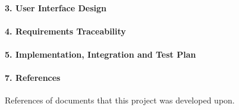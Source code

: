 \documentclass[../DD.tex]{subfiles}
\begin{document}
		\paragraph{3. User Interface Design}
		
		\paragraph{4. Requirements Traceability}

		\paragraph{5. Implementation, Integration and Test Plan}
		
		\paragraph{7. References}
		References of documents that this project was developed upon.
		
		
		
\end{document}

